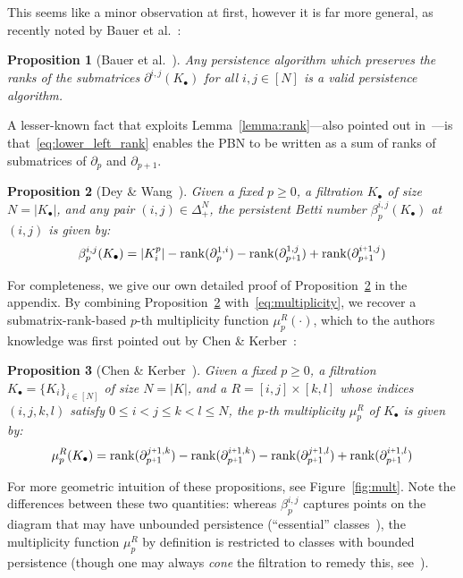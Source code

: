 \documentclass[10pt]{article}
\numberwithin{equation}{section}
\newcommand{\+}{%
	\raisebox{0.18ex}{\scaleobj{0.55}{+}}
}
\newtheorem{proposition}{Proposition}
\theoremstyle{definition}
\theoremstyle{definition}
\begin{document}
This seems like a minor observation at first, however it is far more general, as recently noted by Bauer et al.~\cite{bauer2022keeping}:
\begin{proposition}[Bauer et al.~\cite{bauer2022keeping}]
	Any persistence algorithm which preserves the ranks of the submatrices $\partial^{i,j}(K_\bullet)$ for all $i,j \in [N]$ is a valid persistence algorithm. 
\end{proposition}
\noindent A lesser-known fact that exploits Lemma~\ref{lemma:rank}---also pointed out in~\cite{dey2022computational}---is that~\eqref{eq:lower_left_rank} enables the PBN to be written as a sum of ranks of submatrices of $\partial_p$ and $\partial_{p+1}$.
\begin{proposition}[Dey \& Wang~\cite{dey2022computational}]\label{prop:rank_reduction}
Given a fixed $p \geq 0$, a filtration $K_\bullet$ of size $N = \lvert K_\bullet \rvert$, and any pair $(i,j) \in \Delta_+^N$, the persistent Betti number $\beta_p^{i,j}(K_\bullet)$ at $(i,j)$ is given by:
	\begin{equation}\label{eq:betti_four}
	\beta_p^{i,j}(K_\bullet) = \lvert K_i^p \rvert - \mathrm{rank}(\partial_p^{1,i}) - \mathrm{rank}(\partial_{p\+1 }^{1,j}) + \mathrm{rank}(\partial_{p\+1}^{i \+ 1, j} )
	\end{equation}
\end{proposition}
\noindent For completeness, we give our own detailed proof of Proposition~\ref{prop:rank_reduction} in the appendix. 
By combining Proposition~\ref{prop:rank_reduction} with~\eqref{eq:multiplicity}, we recover a submatrix-rank-based $p$-th multiplicity function $\mu_p^{R}(\cdot)$, which to the authors knowledge was first pointed out by Chen \& Kerber~\cite{chen2011output}: 
\begin{proposition}[Chen \& Kerber~\cite{chen2011output}]\label{prop:mu_reduction}
Given a fixed $p \geq 0$, a filtration $K_\bullet = \{K_i\}_{i\in [N]}$ of size $N = \lvert K \rvert$, and a $R = [i,j] \times [k,l]$ whose indices $(i,j,k,l)$ satisfy $0 \leq i < j \leq k < l \leq N$, the $p$-th multiplicity $\mu_p^{R}$ of $K_\bullet$ is given by:
	\begin{equation}\label{eq:mu_four}
	\mu_p^{R}(K_\bullet) = \mathrm{rank}(\partial_{p\+1}^{j \+ 1, k})  - \mathrm{rank}(\partial_{p\+1}^{i \+ 1, k})  - \mathrm{rank}(\partial_{p\+1}^{j \+ 1, l}) + \mathrm{rank}(\partial_{p\+1}^{i \+ 1, l}) 
	\end{equation}
\end{proposition}
\noindent For more geometric intuition of these propositions, see Figure~\ref{fig:mult}. Note the differences between these two quantities: whereas $\beta_p^{i,j}$ captures points on the diagram that may have unbounded persistence (``essential'' classes~\cite{edelsbrunner2000topological}), the multiplicity function $\mu_p^{R}$ by definition is restricted to classes with bounded persistence (though one may always \emph{cone} the filtration to remedy this, see~\cite{chen2011output}).
\end{document}
